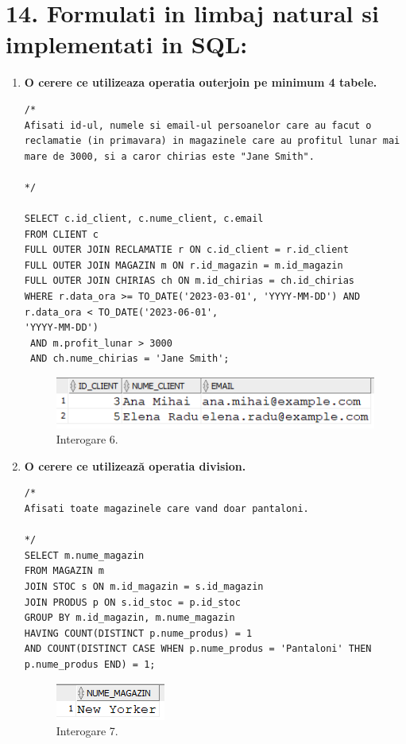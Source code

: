 
\section*{14. Formulati in limbaj natural si implementati in SQL:}

\vspace{0.5cm}
\begin{enumerate}
    \item \textbf{O cerere ce utilizeaza operatia outerjoin pe minimum 4 tabele.}
    \begin{lstlisting}
/*
Afisati id-ul, numele si email-ul persoanelor care au facut o reclamatie (in primavara) in magazinele care au profitul lunar mai mare de 3000, si a caror chirias este "Jane Smith".

*/

SELECT c.id_client, c.nume_client, c.email
FROM CLIENT c
FULL OUTER JOIN RECLAMATIE r ON c.id_client = r.id_client
FULL OUTER JOIN MAGAZIN m ON r.id_magazin = m.id_magazin
FULL OUTER JOIN CHIRIAS ch ON m.id_chirias = ch.id_chirias
WHERE r.data_ora >= TO_DATE('2023-03-01', 'YYYY-MM-DD') AND r.data_ora < TO_DATE('2023-06-01',
'YYYY-MM-DD')
 AND m.profit_lunar > 3000
 AND ch.nume_chirias = 'Jane Smith';
    \end{lstlisting}
    \vspace{0.2cm}
    \begin{figure}[h]
      \centerline{\includegraphics{images/interogare6.png}}
      \caption{ Interogare 6.}
    \end{figure}
    \vspace{0.5cm}

    \item \textbf{O cerere ce utilizează operatia division.}
    \begin{lstlisting}
/*
Afisati toate magazinele care vand doar pantaloni.

*/
SELECT m.nume_magazin
FROM MAGAZIN m
JOIN STOC s ON m.id_magazin = s.id_magazin
JOIN PRODUS p ON s.id_stoc = p.id_stoc
GROUP BY m.id_magazin, m.nume_magazin
HAVING COUNT(DISTINCT p.nume_produs) = 1
AND COUNT(DISTINCT CASE WHEN p.nume_produs = 'Pantaloni' THEN p.nume_produs END) = 1;
    \end{lstlisting}
    \vspace{0.2cm}
    \begin{figure}[h]
      \centerline{\includegraphics{images/interogare7.png}}
      \caption{ Interogare 7.}
    \end{figure}
    \vspace{0.5cm}


\end{enumerate}
